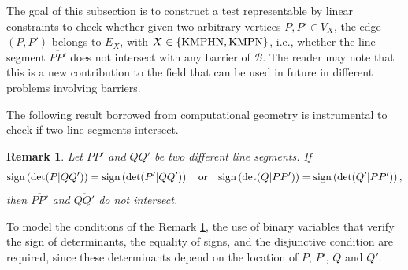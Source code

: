 \documentclass[a4paper,  review, authoryear, 1p.]{elsarticle}
\newcommand{\EB}{{E^{}_{\mathcal B}}}
\newcommand{\EBint}{{E^{int}_{\mathcal B}}}
\newcommand{\VX}{{V^{}_X}}
\newcommand{\EX}{{E^{}_X}}
\newcommand{\VKMPHN}{{V_{\text{KMPHN}}}}
\newcommand{\VKMPN}{{V_{\text{KMPN}}}}
\newtheorem{remark}{Remark}
\newcommand{\JP}[1]{{\color{armygreen}#1}}
\newcommand{\CV}[1]{{\color{blue}#1}}
\newcommand{\determinant}[3]{\det({#1|#2#3})}
\begin{document}
	\JP{The goal of this subsection is to construct  a test representable by linear constraints to check whether given two arbitrary vertices $P, P'\in \VX$, the edge $(P, P')$ \CV{belongs to} $\EX$, with $X\in\{\rm KMPHN, \rm KMPN\}$, i.e., whether the line segment $\overline{PP'}$ does not intersect with any barrier of $\mathcal B$.  The reader may note that this is a new contribution to the field that can be used in future in different problems involving barriers.
	
	The following result borrowed from computational geometry is instrumental to check if two line segments intersect. }
	
	\begin{remark}\label{rem:determinants}
		Let $\overline{PP'}$ and $\overline{QQ'}$ be two different line segments. 
		If
		\begin{equation*}
			\normalfont{\text{sign}}\left(\determinant{P}{Q}{Q'}\right) = \normalfont{\text{sign}}\left(\determinant{P'}{Q}{Q'}\right)
			\quad
			\text{or}
			\quad
			\normalfont{\text{sign}}\left(\determinant{Q}{P}{P'}\right) = \normalfont{\text{sign}}\left(\determinant{Q'}{P}{P'}\right)
			,
		\end{equation*}
		then $\overline{PP'}$ and $\overline{QQ'}$ do not intersect.
	\end{remark}
	
	
	
	
	
	To model the conditions of the Remark \ref{rem:determinants}, the use of binary variables that verify the sign of determinants, the equality of signs, and the disjunctive condition are required, since these determinants depend on the location of $P$, $P'$, $Q$ and $Q'$.
	
\end{document}
